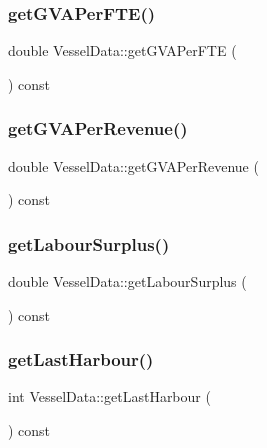 \mbox{\label{class_vessel_data_a468b0f2ae3267953eff62331e500331d}} 
\subsubsection{\texorpdfstring{getGVAPerFTE()}{getGVAPerFTE()}}
{\footnotesize\ttfamily double Vessel\+Data\+::get\+G\+V\+A\+Per\+F\+TE (\begin{DoxyParamCaption}{ }\end{DoxyParamCaption}) const}

\mbox{\label{class_vessel_data_a5bdfdee8005e0c280406f7c27cbd9c3a}} 
\subsubsection{\texorpdfstring{getGVAPerRevenue()}{getGVAPerRevenue()}}
{\footnotesize\ttfamily double Vessel\+Data\+::get\+G\+V\+A\+Per\+Revenue (\begin{DoxyParamCaption}{ }\end{DoxyParamCaption}) const}

\mbox{\label{class_vessel_data_a507bb9c2e218434cdd40b05424efc059}} 
\subsubsection{\texorpdfstring{getLabourSurplus()}{getLabourSurplus()}}
{\footnotesize\ttfamily double Vessel\+Data\+::get\+Labour\+Surplus (\begin{DoxyParamCaption}{ }\end{DoxyParamCaption}) const}

\mbox{\label{class_vessel_data_a08fd4872dd7b6f03e9fdd3339cc8f26b}} 
\subsubsection{\texorpdfstring{getLastHarbour()}{getLastHarbour()}}
{\footnotesize\ttfamily int Vessel\+Data\+::get\+Last\+Harbour (\begin{DoxyParamCaption}{ }\end{DoxyParamCaption}) const}

